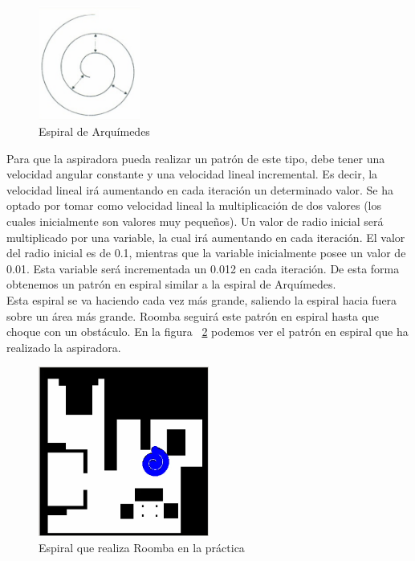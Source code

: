 \begin{figure}[H]
  \begin{center}
    \includegraphics[width=0.3\textwidth]{figures/Vacuum/Espiral_Arquimedes.png}
		\caption{Espiral de Arquímedes}
		\label{fig.Espiral_Arquimedes}
		\end{center}
\end{figure}

Para que la aspiradora pueda realizar un patrón de este tipo, debe tener una velocidad angular constante y una velocidad lineal incremental. Es decir, la velocidad lineal irá aumentando en cada iteración un determinado valor. Se ha optado por tomar como velocidad lineal la multiplicación de dos valores (los cuales inicialmente son valores muy pequeños). Un valor de radio inicial será multiplicado por una variable, la cual irá aumentando en cada iteración. El valor del radio inicial es de 0.1, mientras que la variable inicialmente posee un valor de 0.01. Esta variable será incrementada un 0.012 en cada iteración. De esta forma obtenemos un patrón en espiral similar a la espiral de Arquímedes.\\

Esta espiral se va haciendo cada vez más grande, saliendo la espiral hacia fuera sobre un área más grande. Roomba seguirá este patrón en espiral hasta que choque con un obstáculo. En la figura ~\ref{fig.Espiral_Roomba} podemos ver el patrón en espiral que ha realizado la aspiradora.\\

\begin{figure}[H]
  \begin{center}
    \includegraphics[width=0.5\textwidth]{figures/Vacuum/Espiral_Roomba.png}
		\caption{Espiral que realiza Roomba en la práctica}
		\label{fig.Espiral_Roomba}
		\end{center}
\end{figure}

